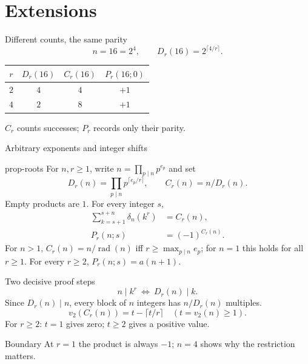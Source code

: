 \documentclass{beamer}
\begin{document}
\section{Extensions}
\begin{frame}{Different counts, the same parity}
\[
n=16=2^4,\qquad D_r(16)=2^{\lceil4/r\rceil}.
\]
\begin{center}
\begin{tabular}{c|c|c|c}
$r$&$D_r(16)$&$C_r(16)$&$P_r(16;0)$\\\hline
$2$&$4$&$4$&$+1$\\
$4$&$2$&$8$&$+1$
\end{tabular}
\end{center}
$C_r$ counts successes; $P_r$ records only their parity.
\end{frame}
\begin{frame}{Arbitrary exponents and integer shifts}
\small
\begin{bookresult}{prop-roots}
For $n,r\ge1$, write $n=\prod_{p\mid n}p^{e_p}$ and set
\[
D_r(n)=\prod_{p\mid n}p^{\lceil e_p/r\rceil},\qquad C_r(n)=n/D_r(n).
\]
Empty products are $1$. For every integer $s$,
\[
\begin{aligned}
\sum_{k=s+1}^{s+n}\delta_n(k^r)&=C_r(n),\\
P_r(n;s)&=(-1)^{C_r(n)}.
\end{aligned}
\]
For $n>1$, $C_r(n)=n/\operatorname{rad}(n)$ iff $r\ge\max_{p\mid n}e_p$; for $n=1$ this holds for all $r\ge1$. For every $r\ge2$, $P_r(n;s)=a(n+1)$.
\end{bookresult}
\end{frame}
\begin{frame}{Two decisive proof steps}
\[
n\mid k^r\ \Longleftrightarrow\ D_r(n)\mid k.
\]
Since $D_r(n)\mid n$, every block of $n$ integers has $n/D_r(n)$ multiples.
\[
v_2(C_r(n))=t-\lceil t/r\rceil\quad(t=v_2(n)\ge1).
\]
For $r\ge2$: $t=1$ gives zero; $t\ge2$ gives a positive value.
\begin{alertblock}{Boundary}
At $r=1$ the product is always $-1$; $n=4$ shows why the restriction matters.
\end{alertblock}
\end{frame}
\end{document}
